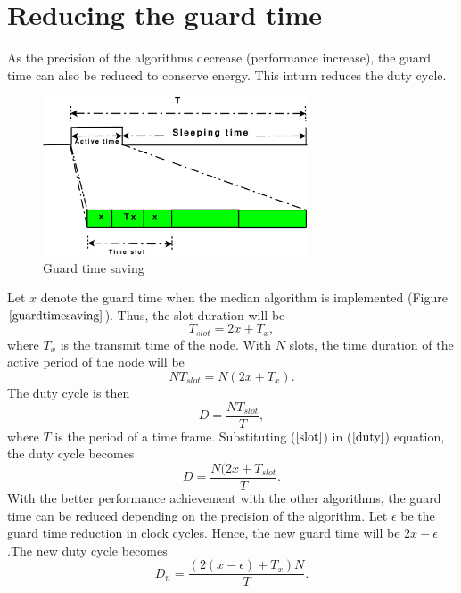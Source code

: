 \documentclass[a4paper,10pt]{report}
\begin{document}
\section{\textbf{Reducing the guard time}}
As the precision of the algorithms decrease (performance increase),
the guard time can also be reduced to conserve energy. This inturn
reduces the duty cycle.
\begin{figure}
\centering
\includegraphics[width=0.7\textwidth]{guardtimesaving}
\caption{Guard time saving} \label{guardtimesaving}
\end{figure}
\newline Let $x$ denote the guard time when the median algorithm is
implemented (Figure $\ref{guardtimesaving}$). Thus, the slot
duration will be
\begin{equation}
T_{slot}=2x + T_x ,
\end{equation}
where $T_x$ is the transmit time of the node. \newline With $N$
slots, the time duration of the active period of the node will be
\begin{equation}
NT_{slot}=N(2x + T_x). \label{slot}
\end{equation}
The duty cycle is then
\begin{equation}
D = \frac{NT_{slot}}{T}, \label{duty}
\end{equation}
where $T$ is the period of a time frame. \newline Substituting
($\ref{slot}$) in ($\ref{duty}$) equation, the duty cycle becomes
\begin{equation}
D= \frac{N(2x+T_{slot}}{T}.
\end{equation}
With the better performance achievement with the other algorithms,
the guard time can be reduced depending on the precision of the
algorithm. Let $\epsilon$ be the guard time reduction in clock
cycles. Hence, the new guard time will be $2x-\epsilon$.\newline The
new duty cycle becomes
\begin{equation}
D_n=\frac{(2(x-\epsilon)+T_x)N}{T}.
\end{equation}
\end{document}
